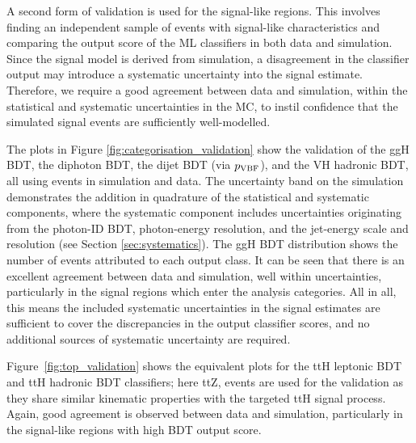 A second form of validation is used for the signal-like regions. This involves finding an independent sample of events with signal-like characteristics and comparing the output score of the ML classifiers in both data and simulation. Since the signal model is derived from simulation, a disagreement in the classifier output may introduce a systematic uncertainty into the signal estimate. Therefore, we require a good agreement between data and simulation, within the statistical and systematic uncertainties in the MC, to instil confidence that the simulated signal events are sufficiently well-modelled.

The plots in Figure \ref{fig:categorisation_validation} show the validation of the ggH BDT, the diphoton BDT, the dijet BDT (via $p_{\rm{VBF}}$), and the VH hadronic BDT, all using \Zee events in simulation and data. The uncertainty band on the simulation demonstrates the addition in quadrature of the statistical and systematic components, where the systematic component includes uncertainties originating from the photon-ID BDT, photon-energy resolution, and the jet-energy scale and resolution (see Section \ref{sec:systematics}). The ggH BDT distribution shows the number of events attributed to each output class. It can be seen that there is an excellent agreement between data and simulation, well within uncertainties, particularly in the signal regions which enter the analysis categories. All in all, this means the included systematic uncertainties in the signal estimates are sufficient to cover the discrepancies in the output classifier scores, and no additional sources of systematic uncertainty are required. 

Figure~\ref{fig:top_validation} shows the equivalent plots for the ttH leptonic BDT and ttH hadronic BDT classifiers; here ttZ, \Zee events are used for the validation as they share similar kinematic properties with the targeted ttH signal process. Again, good agreement is observed between data and simulation, particularly in the signal-like regions with high BDT output score.

